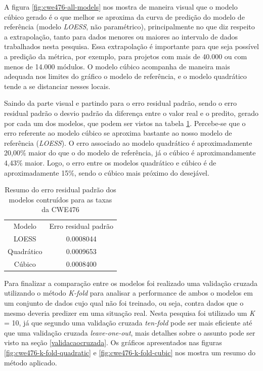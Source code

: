 A figura \ref{fig:cwe476-all-models} nos mostra de maneira visual que o modelo
cúbico gerado é o que melhor se aproxima da curva de predição do modelo de
referência (modelo \textit{LOESS}, não paramétrico), principalmente no que diz
respeito a extrapolação, tanto para dados menores ou maiores ao intervalo de
dados trabalhados nesta pesquisa. Essa extrapolação é importante para que seja
possível a predição da métrica, por exemplo, para projetos com mais de 40.000 ou
com menos de 14.000 módulos. O modelo cúbico acompanha de maneira mais adequada
nos limites do gráfico o modelo de referência, e o modelo quadrático tende a se
distanciar nesses locais.

Saindo da parte visual e partindo para o erro residual padrão, sendo o erro
residual padrão o desvio padrão da diferença entre o valor real e o predito,
gerado por cada um dos modelos, que podem ser vistos na tabela
\ref{tab:cwe476-erros}. Percebe-se que o erro referente ao modelo cúbico se
aproxima bastante ao nosso modelo de referência (\textit{LOESS}). O erro
associado ao modelo quadrático é aproximadamente 20,00\% maior do que o do
modelo de referência, já o cúbico é aproximandamente 4,43\% maior. Logo, o erro
entre os modelos quadrático e cúbico é de aproximadamente 15\%, sendo o cúbico
mais próximo do desejável.

\begin{table}[h]
 \centering
 \begin{tabular}{cc}
  \rowcolor[HTML]{EFEFEF} 
  {Modelo} & {Erro residual padrão} \\
  {LOESS}  & 0.0008044                  \\
  Quadrático   & 0.0009653                  \\
  Cúbico       & 0.0008400                 
 \end{tabular}
 \caption{Resumo do erro residual padrão dos modelos contruídos para as taxas da
 CWE476}
 \label{tab:cwe476-erros}
\end{table}

Para finalizar a comparação entre os modelos foi realizado uma validação cruzada
utilizando o método \textit{K-fold} para analisar a performance de ambos o
modelos em um conjunto de dados cujo qual não foi treinado, ou seja, contra
dados que o mesmo deveria predizer em uma situação real. Nesta pesquisa foi
utilizado um \textit{K} = 10, já que segundo  uma
validação cruzada \textit{ten-fold} pode ser mais eficiente até que uma
validação cruzada \textit{leave-one-out}, mais detalhes sobre o assunto pode ser
visto na seção \ref{validacaocruzada}. Os gráficos apresentados nas figuras
\ref{fig:cwe476-k-fold-quadratic} e \ref{fig:cwe476-k-fold-cubic} nos mostra um
resumo do método aplicado.

